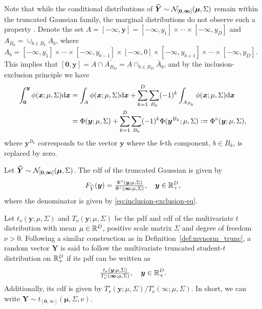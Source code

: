 \documentclass[12pt]{article}
\begin{document}
Note that while the conditional distributions of ${\widehat{\bm Y}}\sim {\mathcal N}_{\left[ \bm 0 , \bm \infty \right]}(\bm \mu, \Sigma)$ remain within the truncated Gaussian family, the marginal distributions do not observe such a property \citep{Horrace:2005}.
Denote the set $A = [-\bm \infty, \bm y] = [-\infty,y_1]\times\cdots\times[-\infty,y_D] $ and 
$A_{B_k} = \cup_{b\in B_k} A_b$, where $A_b = [-\infty,y_1]\times\cdots\times[-\infty,y_{b-1}]\times[-\infty,0]\times[-\infty,y_{b+1}]\times\cdots\times[-\infty,y_D]$.
This implies that 
$[\bm 0,\bm y] = A \cap \bar{A_{B_D}} = A \cap_{b \in B_D} \bar{A}_b$, 
and by the inclusion-exclusion principle we have
%
\begin{align}
\int_{\bm 0}^{\bm y} \phi(\bm x;\mu,\Sigma) \text d \bm x &= \int_{A} \phi(\bm x;\mu,\Sigma) \text d \bm x + \sum_{k=1}^D \sum_{B_k}(-1)^k \int_{A_{B_k}} \phi(\bm x;\mu,\Sigma) \text d \bm x   \nonumber \\
&= \Phi(\bm y;\mu,\Sigma) + \sum_{k=1}^D \sum_{B_k}(-1)^k \Phi(\bm y^{B_k};\mu,\Sigma):= \Phi^\circ(\bm y;\mu,\Sigma)\label{eq:inclusion-exclusion-eq},
\end{align}
%
where $\bm y^{B_k}$ corresponds to the vector $\bm y$ where the $b$-th component, $b\in B_k$, is replaced by zero. 
%
\begin{definition}
Let ${\widehat{\bm Y}}\sim {\mathcal N}_{\left[ \bm 0 , \bm \infty \right]}(\bm \mu, \Sigma)$. The cdf of the truncated Gaussian is given by
%
$$
F_{{\widehat{Y}}}(\bm y) = {\textstyle{\Phi^\circ(\bm y;\mu,\Sigma)\over\Phi^\circ(\bm \infty;\mu,\Sigma)}}, \quad \bm y \in {\mathbb R}^D_+,
$$
where the denominator is given by \eqref{eq:inclusion-exclusion-eq}.
\end{definition}

\begin{definition}
Let $t_\nu(\bm y; \mu, \Sigma)$ and $T_\nu(\bm y; \mu, \Sigma)$ be the pdf and cdf of the multivariate $t$ distribution with mean $\mu\in{\mathbb R}^D$, positive scale matrix $\Sigma$ and degree of freedom $\nu>0$. Following a similar construction as in Definition~\ref{def:mvnorm_trunc}, a random vector $\bm Y$ is said to follow the multivariate truncated student-$t$ distribution on ${\mathbb R}^D_+$ if its pdf can be written as
%
$$
{\textstyle{t_\nu(\bm y; \mu, \Sigma)\over T_{\nu}^\circ( \bm \infty;\mu,\Sigma)}}, \quad \bm y \in {\mathbb R}^D_+.
$$
%
Additionally, its cdf is given by $T_{\nu}^\circ( \bm y;\mu,\Sigma)/ T_{\nu}^\circ( \bm \infty;\mu,\Sigma)$. In short, we can write $\bm Y \sim t_{\left[ \bm 0 , \bm \infty \right]}(\bm \mu, \Sigma, \nu)$.
\end{definition}
\end{document}
